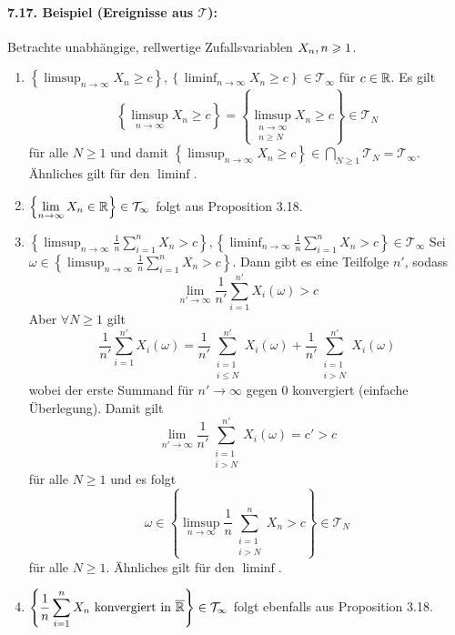 \paragraph{7.17. Beispiel (Ereignisse aus $\mathcal{T}$):}Betrachte unabh\"angige, rellwertige Zufallsvariablen $X_n,n\geq\nobreak1$.
\begin{enumerate}[label=(\roman*)]
    \item $\left\{\displaystyle\limsup_{n\to\infty}X_n\geq c\right\},\left\{\displaystyle\liminf_{n\to\infty}X_n\geq c\right\}\in\mathcal{T}_\infty$ f\"ur $c\in\R$.\newline
    Es gilt
    $$\left\{\displaystyle\limsup_{n\to\infty}X_n\geq c\right\}=\left\{\limsup_{\substack{n\to\infty\\n\geq N}}X_n\geq c\right\}\in\mathcal{T}_N$$
    f\"ur alle $N\geq1$ und damit $\left\{\displaystyle\limsup_{n\to\infty}X_n\geq c\right\}\in\displaystyle\bigcap_{N\geq1}\mathcal{T}_N=\mathcal{T}_\infty$. \"Ahnliches gilt f\"ur den $\liminf$. 
    \item $\displaystyle\left\{\lim_{n\to\infty}X_n\in\R\right\}\in\mathcal{T}_\infty$ folgt aus Proposition 3.18.
    \item $\left\{\displaystyle\limsup_{n\to\infty}\frac{1}{n}\sum_{i=1}^nX_n > c\right\},\left\{\displaystyle\liminf_{n\to\infty}\frac{1}{n}\sum_{i=1}^nX_n > c\right\}\in\mathcal{T}_\infty$\newline
    Sei $\omega\in\left\{\displaystyle\limsup_{n\to\infty}\frac{1}{n}\sum_{i=1}^nX_n > c\right\}$. Dann gibt es eine Teilfolge $n'$, sodass 
    $$\lim_{n'\to\infty}\frac{1}{n'}\sum_{i=1}^{n'}X_i(\omega)>c$$
    Aber $\forall N\geq1$ gilt
    $$\frac{1}{n'}\sum_{i=1}^{n'}X_i(\omega)=\frac{1}{n'}\sum_{\substack{i=1\\i\leq N}}^{n'}X_i(\omega)+\frac{1}{n'}\sum_{\substack{i=1\\i> N}}^{n'}X_i(\omega)$$
    wobei der erste Summand f\"ur $n'\to\infty$ gegen 0 konvergiert (einfache \"Uberlegung). Damit gilt
    $$\lim_{n'\to\infty}\frac{1}{n'}\sum_{\substack{i=1\\i> N}}^{n'}X_i(\omega)=c'>c$$
    f\"ur alle $N\geq1$ und es folgt
    $$\omega\in \left\{\displaystyle\limsup_{n\to\infty}\frac{1}{n}\sum_{\substack{i=1\\i>N}}^nX_n > c\right\}\in\mathcal{T}_N$$
    f\"ur alle $N\geq1$. \"Ahnliches gilt f\"ur den $\liminf$. 
    \item $\left\{\displaystyle\frac{1}{n}\sum_{i=1}^nX_n \text{ konvergiert in }\overline\R\right\}\in\mathcal{T}_\infty$ folgt ebenfalls aus Proposition 3.18. 
\end{enumerate}
